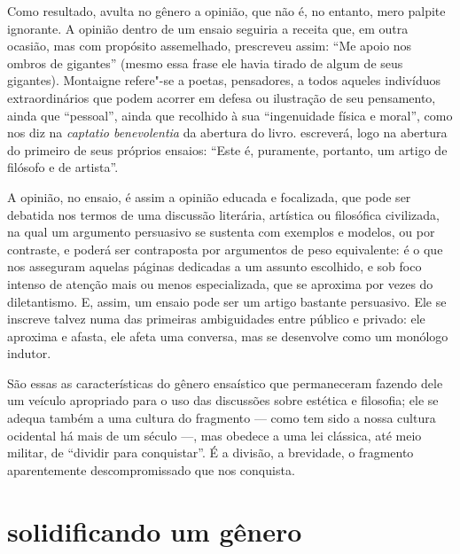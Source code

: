 Como resultado, avulta no gênero a opinião, que não é, no entanto, mero
palpite ignorante. A opinião dentro de um ensaio seguiria a receita
que, em outra ocasião, mas com propósito assemelhado, 
prescreveu assim: “Me apoio nos ombros de gigantes” (mesmo essa frase
ele havia tirado de algum de seus gigantes). Montaigne refere"-se a poetas,
pensadores, a todos aqueles indivíduos extraordinários que podem acorrer
em defesa ou ilustração de seu pensamento, ainda que “pessoal”, ainda
que recolhido à sua “ingenuidade física e moral”, como nos diz na
\textit{captatio benevolentia} da abertura do livro. 
escreverá, logo na abertura do primeiro de seus próprios ensaios: “Este
é, puramente, portanto, um artigo de filósofo e de artista”.

A opinião, no ensaio, é assim a opinião educada e focalizada, que pode
ser debatida nos termos de uma discussão literária, artística ou
filosófica civilizada, na qual um argumento persuasivo se sustenta com
exemplos e modelos, ou por contraste, e poderá ser contraposta por
argumentos de peso equivalente: é o que nos asseguram aquelas páginas
dedicadas a um assunto escolhido, e sob foco intenso de atenção mais ou
menos especializada, que se aproxima por vezes do diletantismo. E,
assim, um ensaio pode ser um artigo bastante persuasivo. Ele se
inscreve talvez numa das primeiras ambiguidades entre público e
privado: ele aproxima e afasta, ele afeta uma conversa, mas se
desenvolve como um monólogo indutor.

São essas as características do gênero ensaístico que permaneceram
fazendo dele um veículo apropriado para o uso das discussões sobre
estética e filosofia; ele se adequa também a uma cultura do fragmento
--- como tem sido a nossa cultura ocidental há mais de um século ---,
mas obedece a uma lei clássica, até meio militar, de “dividir para
conquistar”. É a divisão, a brevidade, o fragmento aparentemente
descompromissado que nos conquista.

\section{solidificando um gênero}

